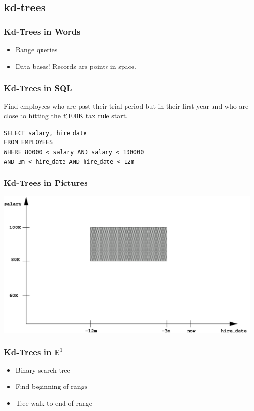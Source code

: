 \documentclass{beamer}
\begin{document}
\subsection{kd-trees}

\begin{frame}
  \frametitle{Kd-Trees in Words}
  \begin{itemize}
  \item Range queries
    \pause
  \item Data bases!  Records are points in space.
  \end{itemize}
\end{frame}

\begin{frame}
  \frametitle{Kd-Trees in SQL}

  Find employees who are past their trial period but in their first
  year and who are close to hitting the \pounds 100K tax rule start.

  \bigskip

  \texttt{SELECT salary, hire$\_$date\\
  FROM EMPLOYEES\\
  WHERE 80000 < salary AND salary < 100000\\
  AND 3m < hire$\_$date AND hire$\_$date < 12m}
\end{frame}

\begin{frame}
  \frametitle{Kd-Trees in Pictures}

  \includegraphics[width=\textwidth]{kd-SQL.pdf}
\end{frame}

\begin{frame}
  \frametitle{Kd-Trees in $\mathbb{R}^1$}
  
  \begin{itemize}
  \item Binary search tree
  \item Find beginning of range
  \item Tree walk to end of range
  \end{itemize}
\end{frame}
\end{document}
